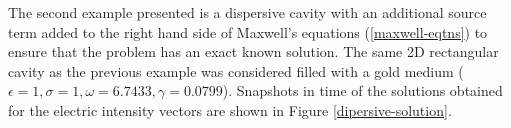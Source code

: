\documentclass[times,11pt]{ACME2015article}
\begin{document}
% 




The second example presented is a dispersive cavity with an additional source term added to the right hand side of Maxwell's equations (\eqref{maxwell-eqtns}) to ensure that the problem has an exact known solution. The same 2D rectangular cavity as the previous example was considered filled with a gold medium ($\epsilon = 1, \sigma = 1, \omega = 6.7433, \gamma = 0.0799 $). Snapshots in time of the solutions obtained for the electric intensity vectors are shown in Figure \ref{dipersive-solution}.
\end{document}
